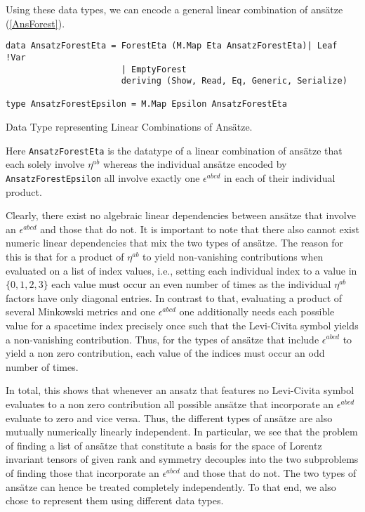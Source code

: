 Using these data types, we can encode a general linear combination of ansätze (\ref{AnsForest}).
\begin{listing}[hbt!] 
\begin{verbatim}
data AnsatzForestEta = ForestEta (M.Map Eta AnsatzForestEta)| Leaf !Var
                       | EmptyForest 
                       deriving (Show, Read, Eq, Generic, Serialize)

type AnsatzForestEpsilon = M.Map Epsilon AnsatzForestEta
\end{verbatim} 
\caption{Data Type representing Linear Combinations of Ansätze.}\label{AnsForest}
\end{listing}
Here \texttt{AnsatzForestEta} is the datatype of a linear combination of ansätze that each solely involve $\eta^{ab}$ whereas the individual ansätze encoded by \texttt{AnsatzForestEpsilon} all involve exactly one $\epsilon^{abcd}$ in each of their individual product.

Clearly, there exist no algebraic linear dependencies between ansätze that involve an $\epsilon^{abcd}$ and those that do not. 
It is important to note that there also cannot exist numeric linear dependencies that mix the two types of ansätze. The reason for this is that for a product of $\eta^{ab}$ to yield non-vanishing contributions when evaluated on a list of index values, i.e., setting each individual index to a value in $\{0,1,2,3 \}$ each value must occur an even number of times as the individual $\eta^{ab}$ factors have only diagonal entries. In contrast to that, evaluating a product of several Minkowski metrics and one $\epsilon^{abcd}$ one additionally needs each possible value for a spacetime index precisely once such that the Levi-Civita symbol yields a non-vanishing contribution. Thus, for the types of ansätze that include $\epsilon^{abcd}$ to yield a non zero contribution, each value of the indices must occur an odd number of times.

In total, this shows that whenever an ansatz that features no Levi-Civita symbol evaluates to a non zero contribution all possible ansätze that incorporate an $\epsilon^{abcd}$ evaluate to zero and vice versa. Thus, the different types of ansätze are also mutually numerically linearly independent. In particular, we see that the problem of finding a list of ansätze that constitute a basis for the space of Lorentz invariant tensors of given rank and symmetry decouples into the two subproblems of finding those that incorporate an $\epsilon^{abcd}$ and those that do not. The two types of ansätze can hence be treated completely independently. To that end, we also chose to represent them using different data types. 

